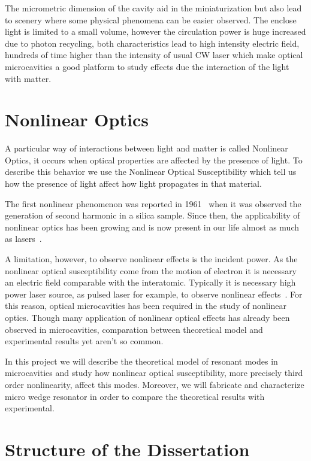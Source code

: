 The micrometric dimension of the cavity aid in the miniaturization but also lead to scenery where some physical phenomena can be easier observed. The enclose light is limited to a small volume, however the circulation power is huge increased due to photon recycling, both characteristics lead to high intensity electric field, hundreds of time higher than the intensity of usual CW laser which make optical microcavities a good platform to study effects due the interaction of the light with matter.

\section{Nonlinear Optics}
A particular way of interactions between light and matter is called Nonlinear Optics, it occurs when optical properties are affected by the presence of light. To describe this behavior we use the Nonlinear Optical Susceptibility which tell us how the presence of light affect how light propagates in that material.

The first nonlinear phenomenon was reported in 1961~\cite{Franken_1961} when it was observed the generation of second harmonic in a silica sample. Since then, the applicability of nonlinear optics has been growing and is now present in our life almost as much as lasers~\cite{Garmire_13}. 

A limitation, however, to observe nonlinear effects is the incident power. As the nonlinear optical susceptibility come from the motion of electron it is necessary an electric field comparable with the interatomic. Typically it is necessary high power laser source, as pulsed laser for example, to observe nonlinear effects~\cite{Wang_2018, Billat_2017, Giancarlo_2018}. For this reason, optical microcavities has been required in the study of nonlinear optics. Though many application of nonlinear optical effects has already been observed in microcavities\cite{Papp_14,Chen_19,Zhang_19,Li_18,Pernice_12,Luo_17,Lin_16,Li_2018}, comparation between theoretical model and experimental results yet aren't so common\cite{Khitrova_1999, Kippenberg_04}. 

In this project we will describe the theoretical model of resonant modes in microcavities and study how nonlinear optical susceptibility, more precisely third order nonlinearity, affect this modes. Moreover, we will fabricate and characterize micro wedge resonator in order to compare the theoretical results with experimental.  

\section{Structure of the Dissertation}

